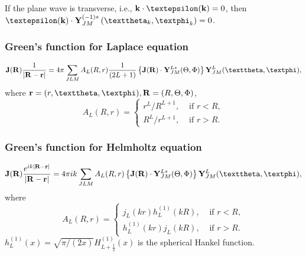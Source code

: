 If the plane wave is transverse, i.e., $\vect{k} \cdot \boldsymbol{\varepsilon}(\vect{k})=0$, then $\boldsymbol{\varepsilon}(\vect{k}) \cdot \vect{Y}_{J M}^{(-1) *}\left(\vartheta_{k}, \varphi_{k}\right)=0$.
\subsubsection{Green's function for Laplace equation}
\begin{equation}
\vect{J}(\vect{R}) \frac{1}{|\vect{R}-\vect{r}|}=4 \pi \sum_{J L M} A_{L}(R, r) \frac{1}{(2 L+1)}\left\{\vect{J}(\vect{R}) \cdot \vect{Y}_{J M}^{L *}(\Theta, \Phi)\right\} \vect{Y}_{J M}^{L}(\vartheta, \varphi), \label{eq:7:3:136}
\end{equation}
where $\vect{r}=(r, \vartheta, \varphi), \vect{R}=(R, \Theta, \Phi)$,
\begin{equation}
A_{L}(R, r)= \begin{cases}{r^{L}}/{R^{L+1}}, & \text { if } r<R  ,
    \\ {R^{L}}/{r^{L+1}}, & \text { if } r>R.\end{cases} \label{eq:7:3:137}
\end{equation}
\subsubsection{Green's function for Helmholtz equation}
\begin{equation}
\vect{J}(\vect{R}) \frac{e^{i k|\vect{R}-\vect{r}|}}{|\vect{R}-\vect{r}|}=4 \pi i k \sum_{J L M} A_{L}(R, r)\left\{\vect{J}(\vect{R}) \cdot\vect{Y}_{J M}^{L *}(\Theta, \Phi)\right\} \vect{Y}_{J M}^{L}(\vartheta, \varphi), \label{eq:7:3:138}
\end{equation}
where
\begin{equation}
A_{L}(R, r)= \begin{cases}j_{L}(k r) h_{L}^{(1)}(k R), & \text { if } r<R,
    \\ h_{L}^{(1)}(k r) j_{L}(k R), & \text { if } r>R.\end{cases}
    \label{eq:7:3:139}
\end{equation}
$h_{L}^{(1)}(x)=\sqrt{\pi /(2 x)} H_{L+\frac{1}{2}}^{(1)}(x)$ is the spherical Hankel function.


